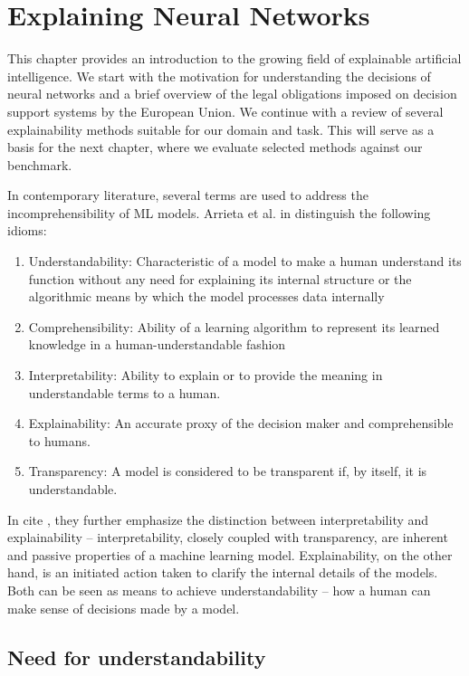 \chapter{Explaining Neural Networks}

This chapter provides an introduction to the growing field of explainable artificial intelligence.
We start with the motivation for understanding the decisions of neural networks and a brief overview of the legal obligations imposed on decision support systems by the European Union.
We continue with a review of several explainability methods suitable for our domain and task.
This will serve as a basis for the next chapter, where we evaluate selected methods against our benchmark.

In contemporary literature, several terms are used to address the incomprehensibility of ML models. Arrieta et al. in \cite{arrieta-taxonomy} distinguish the following idioms:

\begin{enumerate}
    \item Understandability: Characteristic of a model to make a human understand its function without any need for explaining its internal structure or the algorithmic means by which the model processes data internally
    \item Comprehensibility: Ability of a learning algorithm to represent its learned knowledge in a human-understandable fashion 
    \item Interpretability: Ability to explain or to provide the meaning in understandable terms to a human.
    \item Explainability: An accurate proxy of the decision maker and comprehensible to humans.
    \item Transparency: A model is considered to be transparent if, by itself, it is understandable.
\end{enumerate}

In cite \cite{arrieta-taxonomy}, they further emphasize the distinction between interpretability and explainability -- interpretability, closely coupled with transparency, are inherent and passive properties of a machine learning model.
Explainability, on the other hand, is an initiated action taken to clarify the internal details of the models.
Both can be seen as means to achieve understandability -- how a human can make sense of decisions made by a model.


\section{Need for understandability}\label{sec:need-for-xai}

